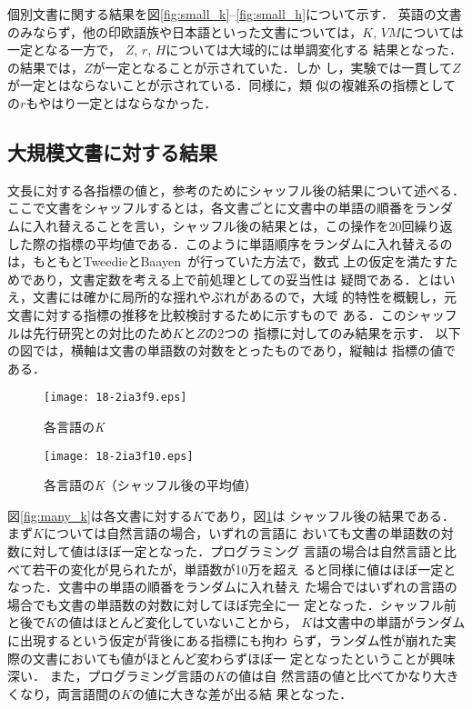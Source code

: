 \documentclass[japanese]{jnlp_JS2.0}
\begin{document}
個別文書に関する結果を図\ref{fig:small_k}--\ref{fig:small_h}について示す．
英語の文書のみならず，他の印欧語族や日本語といった文書については，$K$,
$\mathit{VM}$については一定となる一方で，
\pagebreak
$Z$, $r$, $H$については大域的には単調変化する
結果となった．
\cite{BaayenTweedie}の結果では，$Z$が一定となることが示されていた．しか
し，実験では一貫して$Z$が一定とはならないことが示されている．同様に，類
似の複雑系の指標としての$r$もやはり一定とはならなかった．


\subsection{大規模文書に対する結果} 
\label{result_normal}

文長に対する各指標の値と，参考のためにシャッフル後の結果について述べる．
ここで文書をシャッフルするとは，各文書ごとに文書中の単語の順番をランダ
ムに入れ替えることを言い，シャッフル後の結果とは，この操作を20回繰り返
した際の指標の平均値である．このように単語順序をランダムに入れ替えるの
は，もともとTweedieとBaayen~\cite{BaayenTweedie}が行っていた方法で，数式
上の仮定を満たすためであり，文書定数を考える上で前処理としての妥当性は
疑問である．とはいえ，文書には確かに局所的な揺れやぶれがあるので，大域
的特性を概観し，元文書に対する指標の推移を比較検討するために示すもので
ある．このシャッフルは先行研究との対比のため$K$と$Z$の2つの
指標に対してのみ結果を示す．
以下の図では，横軸は文書の単語数の対数をとったものであり，縦軸は
指標の値である．

\begin{figure}[b]
\noindent
 \begin{minipage}{0.5\textwidth}
  \begin{center}
   \texttt{[image: 18-2ia3f9.eps]}
  \end{center}
  \caption{各言語の{\it K}}
  \label{fig:many_k}
 \end{minipage}
 \begin{minipage}{0.5\textwidth}
  \begin{center}
   \texttt{[image: 18-2ia3f10.eps]}
  \end{center}
  \caption{各言語の{\it K}（シャッフル後の平均値）}
 \label{fig:many_sh_k}
 \end{minipage}
\end{figure}

図\ref{fig:many_k}は各文書に対する$K$であり，図\ref{fig:many_sh_k}は
シャッフル後の結果である．まず$K$については自然言語の場合，いずれの言語に
おいても文書の単語数の対数に対して値はほぼ一定となった．プログラミング
言語の場合は自然言語と比べて若干の変化が見られたが，単語数が10万を超え
ると同様に値はほぼ一定となった．文書中の単語の順番をランダムに入れ替え
た場合ではいずれの言語の場合でも文書の単語数の対数に対してほぼ完全に一
定となった．シャッフル前と後で$K$の値はほとんど変化していないことから，
$K$は文書中の単語がランダムに出現するという仮定が背後にある指標にも拘わ
らず，ランダム性が崩れた実際の文書においても値がほとんど変わらずほぼ一
定となったということが興味深い． また，プログラミング言語の$K$の値は自
然言語の値と比べてかなり大きくなり，両言語間の$K$の値に大きな差が出る結
果となった．
\end{document}
